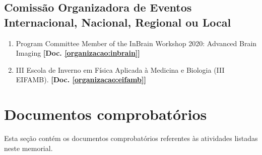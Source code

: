 \documentclass[a4paper,oneside,10pt]{article}
\newcounter{document}%
\begin{document}

\subsection{Comiss\~{a}o Organizadora de Eventos Internacional, Nacional, Regional ou Local}
\vspace{0.3cm}

\begin{enumerate}
\renewcommand{\labelenumi}{{\large\bfseries\arabic{enumi}.}}

    \item Program Committee Member of the InBrain Workshop 2020: Advanced Brain Imaging \textbf{[Doc. \ref{organizacao:inbrain}]}

    \item III Escola de Inverno em Física Aplicada à Medicina e Biologia (III EIFAMB). \textbf{[Doc. \ref{organizacao:eifamb}]}
    
\end{enumerate}


\clearpage
\appendix
\newpage
\section{Documentos comprobatórios}
Esta seção contém os documentos comprobatórios referentes às atividades listadas neste memorial.
\renewcommand{\thesubsection}{\arabic{subsection}}


\end{document}
